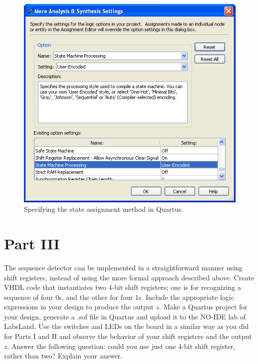 \documentclass[epsfig,10pt,fullpage]{article}
\begin{document}
\begin{figure}[H]
\centerline{
\includegraphics[scale = 0.75]{figures/figure4.png}}
\caption{Specifying the state assignment method in Quartus.}
\label{fig:fig7_4}
\end{figure}

\section*{Part III}
The sequence detector can be implemented in a straightforward manner using shift registers,
instead of using the more formal approach described above. Create VHDL code that
instantiates two 4-bit shift registers; one is for recognizing a sequence of four 0s, and
the other for four 1s. Include the appropriate logic expressions in your design
to produce the output $z$. Make a Quartus project for your design, generate a .sof file in Quartus and upload it to the NO-IDE lab of LabsLand. Use the switches and LEDs on the board in a similar way as
you did for Parts I and II and observe the behavior of your shift registers and the
output $z$. Answer the following question: could you use just one 4-bit shift
register, rather than two? Explain your answer.

~\newpage
\end{document}
